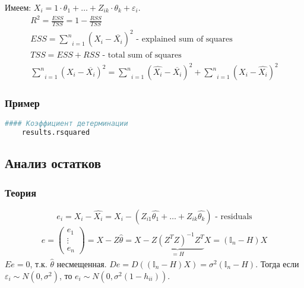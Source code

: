 Имеем: $X_i = 1 \cdot \theta_1 + \dots + Z_{ik} \cdot \theta_k + \varepsilon_i$.
$$\begin{gathered}
	R^2 = \frac{ESS}{TSS} = 1 - \frac{RSS}{TSS} \\
	ESS = \underset{i=1}{\overset{n}{\sum}}\left( \hat{X_i} - \overline{X_i} \right)^2 \text{ - explained sum of squares} \\
	TSS = ESS + RSS \text{ - total sum of squares} \\
	\underset{i=1}{\overset{n}{\sum}}\left( X_i - \overline{X_i} \right)^2 = \underset{i=1}{\overset{n}{\sum}}\left( \hat{X_i} - \overline{X_i} \right)^2 + \underset{i=1}{\overset{n}{\sum}}\left( X_i - \hat{X_i} \right)^2
\end{gathered}$$

\subsubsection*{Пример}\label{cha:linreg/sec:det+ost/subsec:det/subsubsec:prob}

\begin{lstlisting}[language=Python]
	#### Коэффициент детерминации
	results.rsquared
\end{lstlisting}

\subsection*{Анализ остатков}\label{cha:linreg/sec:det+ost/subsec:ost}

\subsubsection*{Теория}\label{cha:linreg/sec:det+ost/subsec:ost/subsubsec:theory}

$$e_i = X_i - \hat{X_i} = X_i - (Z_{i1} \hat{\theta_1} + \dots + Z_{ik} \hat{\theta_k}) \text{ - residuals}$$
$$\begin{gathered}
	e = 
	\begin{pmatrix}
		e_1 \\ \vdots \\ e_n
	\end{pmatrix} = X - Z \hat{\theta} = X - \underbrace{Z \left( Z^T Z \right)^{-1} Z^T}_{= H} X = \left( \mathbb{I}_n - H \right) X
\end{gathered}$$
$E e = 0$, т.к. $\hat{\theta}$ несмещенная. $D e = D \left( \left( \mathbb{I}_n - H \right) X \right) = \sigma^2 \left( \mathbb{I}_n - H \right)$. Тогда если $ \varepsilon_i \sim N(0, \sigma^2)$, то $e_i \sim N(0, \sigma^2 (1-h_{ii}))$.

